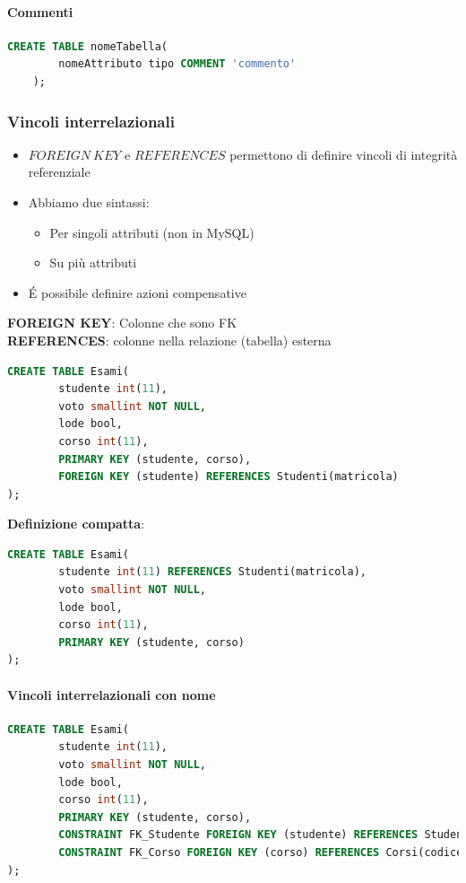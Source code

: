 \documentclass[12pt,a4paper]{article}
\begin{document}
\paragraph{Commenti}
\flushleft
\begin{lstlisting}[language = SQL]
CREATE TABLE nomeTabella(
        nomeAttributo tipo COMMENT 'commento'
    );
\end{lstlisting}

\subsubsection{Vincoli interrelazionali}
\begin{itemize}
\item $FOREIGN\ KEY$ e $REFERENCES$ permettono di definire vincoli di integrità referenziale
\item Abbiamo due sintassi:
\begin{itemize}
\item Per singoli attributi (non in MySQL)
\item Su più attributi
\end{itemize}
\item \'E possibile definire azioni compensative
\end{itemize}
\textbf{FOREIGN KEY}: Colonne che sono FK\\
\textbf{REFERENCES}: colonne nella relazione (tabella) esterna

\MidSep \noindent
\begin{lstlisting}[language = SQL]
CREATE TABLE Esami(
        studente int(11),
        voto smallint NOT NULL,
        lode bool,
        corso int(11),
        PRIMARY KEY (studente, corso),
        FOREIGN KEY (studente) REFERENCES Studenti(matricola)
);
\end{lstlisting}
\textbf{Definizione compatta}:
\begin{lstlisting}[language = SQL]
CREATE TABLE Esami(
        studente int(11) REFERENCES Studenti(matricola),
        voto smallint NOT NULL,
        lode bool,
        corso int(11),
        PRIMARY KEY (studente, corso)
);
\end{lstlisting}

\paragraph{Vincoli interrelazionali con nome}
\flushleft
\begin{lstlisting}[language = SQL]
CREATE TABLE Esami(
        studente int(11),
        voto smallint NOT NULL,
        lode bool,
        corso int(11),
        PRIMARY KEY (studente, corso),
        CONSTRAINT FK_Studente FOREIGN KEY (studente) REFERENCES Studenti(matricola)
        CONSTRAINT FK_Corso FOREIGN KEY (corso) REFERENCES Corsi(codice)
);
\end{lstlisting}
\end{document}

